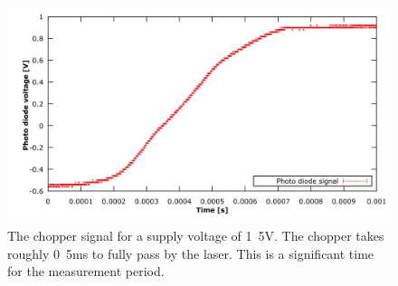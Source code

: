 \begin{figure}[H]
\centering
\includegraphics[width=1.0\linewidth]{graphics/chopper1,5V}
\caption[Chopper signal 1.5V]{The chopper signal for a supply voltage of \unit{1.5}{V}. The chopper takes roughly \unit{0.5}{ms} to fully pass by the laser. This is a significant time for the measurement period.}
\label{fig:chopper1}
\end{figure}




